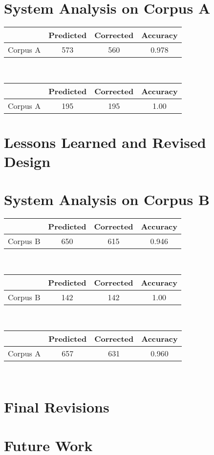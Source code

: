 \documentclass[11pt,letterpaper]{article}
\begin{document}
\section{System Analysis on Corpus A}

\begin{tabular}{|c|ccc|}
\hline 
 & Predicted & Corrected & Accuracy \\ 
\hline 
Corpus A & 573 & 560 & 0.978 \\ 
\hline 
\end{tabular} 
\\
\begin{tabular}{|c|ccc|}
\hline 
 & Predicted & Corrected & Accuracy \\ 
\hline 
Corpus A & 195 & 195 & 1.00 \\ 
\hline 
\end{tabular} 

\section{Lessons Learned and Revised Design}

\section{System Analysis on Corpus B}
\begin{tabular}{|c|ccc|}
\hline 
 & Predicted & Corrected & Accuracy \\ 
\hline 
Corpus B & 650 & 615 & 0.946 \\ 
\hline 
\end{tabular} 
\\
\begin{tabular}{|c|ccc|}
\hline 
 & Predicted & Corrected & Accuracy \\ 
\hline 
Corpus B & 142 & 142 & 1.00 \\ 
\hline 
\end{tabular} 
\\
\begin{tabular}{|c|ccc|}
\hline 
 & Predicted & Corrected & Accuracy \\ 
\hline 
Corpus A & 657 & 631 & 0.960 \\ 
\hline 
\end{tabular} 
\\



\section{Final Revisions}

\section{Future Work}




\renewcommand\refname{References}




\label{lastpage}
\end{document}
